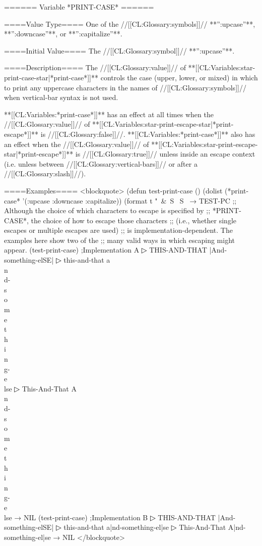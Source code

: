 ====== Variable *PRINT-CASE* ======

====Value Type====
One of the //[[CL:Glossary:symbols]]// **'':upcase''**, **'':downcase''**, or **'':capitalize''**.

====Initial Value====
The //[[CL:Glossary:symbol]]// **'':upcase''**.

====Description====
The //[[CL:Glossary:value]]// of **[[CL:Variables:star-print-case-star|*print-case*]]** controls the case (upper, lower, or mixed) in which to print any uppercase characters in the names of //[[CL:Glossary:symbols]]// when vertical-bar syntax is not used.

**[[CL:Variables:*print-case*]]** has an effect at all times when the //[[CL:Glossary:value]]// of **[[CL:Variables:star-print-escape-star|*print-escape*]]** is //[[CL:Glossary:false]]//. **[[CL:Variables:*print-case*]]** also has an effect when the //[[CL:Glossary:value]]// of **[[CL:Variables:star-print-escape-star|*print-escape*]]** is //[[CL:Glossary:true]]// unless inside an escape context (i.e. unless between //[[CL:Glossary:vertical-bars]]// or after a //[[CL:Glossary:slash]]//).

====Examples====
<blockquote> (defun test-print-case () (dolist (*print-case* '(:upcase :downcase :capitalize)) (format t "~&~S ~S~ → TEST-PC ;; Although the choice of which characters to escape is specified by ;; *PRINT-CASE*, the choice of how to escape those characters ;; (i.e., whether single escapes or multiple escapes are used) ;; is implementation-dependent. The examples here show two of the ;; many valid ways in which escaping might appear. (test-print-case) ;Implementation A
▷ THIS-AND-THAT |And-something-elSE|
▷ this-and-that a\\n\\d-\\s\\o\\m\\e\\t\\h\\i\\n\\g-\\e\\lse
▷ This-And-That A\\n\\d-\\s\\o\\m\\e\\t\\h\\i\\n\\g-\\e\\lse → NIL (test-print-case) ;Implementation B
▷ THIS-AND-THAT |And-something-elSE|
▷ this-and-that a|nd-something-el|se
▷ This-And-That A|nd-something-el|se → NIL </blockquote>

